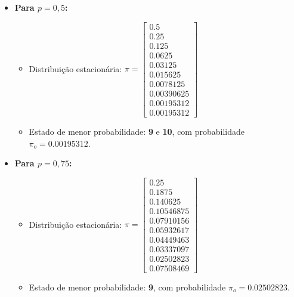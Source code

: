 \begin{enumerate}
\begin{resposta}
\begin{itemize}
            \item \textbf{Para $p = 0{,}5$:}
            \begin{itemize}
                \item Distribuição estacionária:
                $
                \pi = 
                \begin{bmatrix}
                0.5 \\
                0.25 \\
                0.125 \\
                0.0625 \\
                0.03125 \\
                0.015625 \\
                0.0078125 \\
                0.00390625 \\
                \boxed{0.00195312} \\
                \boxed{0.00195312}
                \end{bmatrix}
                $
                \item Estado de menor probabilidade: \textbf{9} e \textbf{10}, com probabilidade $\boxed{\pi_o = 0.00195312}$.
            \end{itemize}

            \item \textbf{Para $p = 0{,}75$:}
            \begin{itemize}
                \item Distribuição estacionária:
                $
                \pi = 
                \begin{bmatrix}
                0.25 \\
                0.1875 \\
                0.140625 \\
                0.10546875 \\
                0.07910156 \\
                0.05932617 \\
                0.04449463 \\
                0.03337097 \\
                \boxed{0.02502823} \\
                0.07508469
                \end{bmatrix}
                $
                \item Estado de menor probabilidade: \textbf{9}, com probabilidade $\boxed{\pi_o = 0.02502823}$.
            \end{itemize}
        \end{itemize}


\end{resposta}
\end{enumerate}
